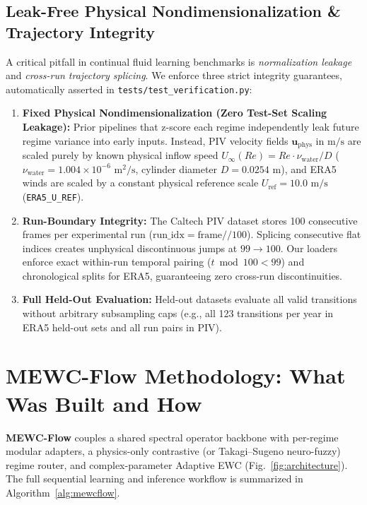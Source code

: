 \documentclass[11pt,a4paper]{article}
\begin{document}
\subsection{Leak-Free Physical Nondimensionalization \& Trajectory Integrity}

A critical pitfall in continual fluid learning benchmarks is \emph{normalization leakage} and \emph{cross-run trajectory splicing}. We enforce three strict integrity guarantees, automatically asserted in \texttt{tests/test\_verification.py}:
\begin{enumerate}
  \item \textbf{Fixed Physical Nondimensionalization (Zero Test-Set Scaling Leakage):} Prior pipelines that z-score each regime independently leak future regime variance into early inputs. Instead, PIV velocity fields $\mathbf{u}_{\text{phys}}$ in $\text{m/s}$ are scaled purely by known physical inflow speed $U_{\infty}(Re) = Re \cdot \nu_{\text{water}} / D$ ($\nu_{\text{water}} = 1.004 \times 10^{-6}\text{ m}^2/\text{s}$, cylinder diameter $D = 0.0254\text{ m}$), and ERA5 winds are scaled by a constant physical reference scale $U_{\text{ref}} = 10.0\text{ m/s}$ (\texttt{ERA5\_U\_REF}).
  \item \textbf{Run-Boundary Integrity:} The Caltech PIV dataset stores 100 consecutive frames per experimental run ($\text{run\_idx} = \text{frame} // 100$). Splicing consecutive flat indices creates unphysical discontinuous jumps at $99 \to 100$. Our loaders enforce exact within-run temporal pairing ($t \bmod 100 < 99$) and chronological splits for ERA5, guaranteeing zero cross-run discontinuities.
  \item \textbf{Full Held-Out Evaluation:} Held-out datasets evaluate all valid transitions without arbitrary subsampling caps (e.g., all 123 transitions per year in ERA5 held-out sets and all run pairs in PIV).
\end{enumerate}

\section{MEWC-Flow Methodology: What Was Built and How}

\textbf{MEWC-Flow} couples a shared spectral operator backbone with per-regime modular adapters, a physics-only contrastive (or Takagi--Sugeno neuro-fuzzy) regime router, and complex-parameter Adaptive EWC (Fig.~\ref{fig:architecture}). The full sequential learning and inference workflow is summarized in Algorithm~\ref{alg:mewcflow}.
\end{document}
